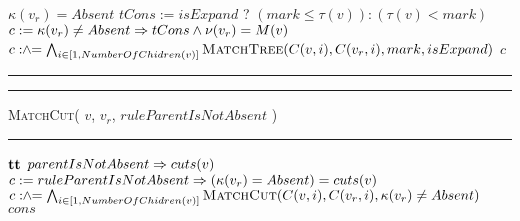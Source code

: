 \begin{algorithm}[t]
\begin{algorithmic}[1]
     \Return $\kappa(v_r) = Absent$ \EndIf
    \label{line:matchtree-v-absent}
    \State $tCons := isExpand$ \;? $( mark \leq \tau(v) ): ( \tau(v) < mark )$
    \State $c := \kappa(v_r) \neq Absent \Rightarrow tCons \land \nu(v_r)= M(v) $
    \label{line:matchtree-cons}
    \State  $c \mathrel{:\hspace{-3pt}\land\hspace{-3pt}=} \bigwedge_{i \in [1,NumberOfChidren(v)]} \textsc{MatchTree}( C(v,i), C(v_r,i), mark, isExpand)$
    \label{line:matchtree-recurse}
    \State \Return $c$   
  \end{algorithmic}
  \hrule
  \vspace{1ex}
  \hrule\vspace{2pt}
  \textsc{MatchCut}( $v$, $v_r$, $ruleParentIsNotAbsent$ )\hfill\mbox{}
  \vspace{2pt}\hrule
  \begin{algorithmic}[1]
     \Return $\mathbf{tt}$ \EndIf
    \label{line:mcut-no-v}
     \Return $parentIsNotAbsent \Rightarrow cuts(v)$ \EndIf
    \label{line:mcut-no-vr}
    \State $c := ruleParentIsNotAbsent \Rightarrow ( \kappa(v_r) = Absent) = cuts(v)$
    \label{line:mcut-cons}
    \State $c \mathrel{:\hspace{-3pt}\land\hspace{-3pt}=} \bigwedge_{i \in [1,NumberOfChidren(v)]}\textsc{MatchCut}( C(v,i), C(v_r,i), \kappa(v_r) \neq Absent)$
    \label{line:mcut-kids}
    \State \Return $cons$
  \end{algorithmic}      

\end{algorithm}


